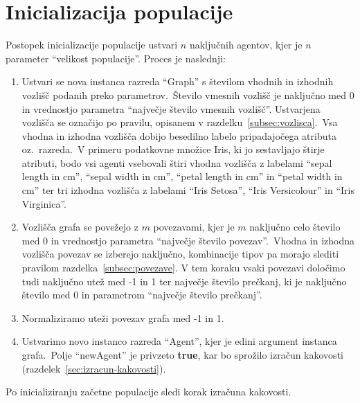 \documentclass[a4paper,12pt,openright]{book}
\begin{document}
    \section{Inicializacija populacije}\label{sec:inicializacija-populacije}
    Postopek inicializacije populacije ustvari $n$ naključnih agentov, kjer je $n$ parameter \enquote{velikost populacije}.
    Proces je naslednji:
    \begin{enumerate}
        \item Ustvari se nova instanca razreda \enquote{Graph} s številom vhodnih in izhodnih vozlišč podanih
        preko parametrov.\ Število vmesnih vozlišč je naključno med 0 in vrednostjo parametra \enquote{največje število vmesnih vozlišč}.
        Ustvarjena vozlišča se označijo po pravilu, opisanem v razdelku~\ref{subsec:vozlisca}.\ Vsa vhodna in izhodna vozlišča
        dobijo besedilno labelo pripadajočega atributa oz.\ razreda.\ V primeru podatkovne množice Iris, ki jo sestavljajo štirje atributi, bodo vsi agenti
        vsebovali štiri vhodna vozlišča z labelami \enquote{sepal length in cm}, \enquote{sepal width in cm}, \enquote{petal length in cm} in
        \enquote{petal width in cm} ter tri izhodna vozlišča z labelami \enquote{Iris Setosa}, \enquote{Iris Versicolour} in
        \enquote{Iris Virginica}.
        \item Vozlišča grafa se povežejo z $m$ povezavami, kjer je $m$ naključno celo število med 0 in vrednostjo
        parametra \enquote{največje število povezav}.\ Vhodna in izhodna vozlišča povezav se izberejo naključno, kombinacije tipov pa
        morajo slediti pravilom razdelka~\ref{subsec:povezave}.
        V tem koraku vsaki povezavi določimo tudi naključno utež med -1 in 1 ter največje število prečkanj, ki je naključno število med 0 in parametrom
        \enquote{največje število prečkanj}.
        \item Normaliziramo uteži povezav grafa med -1 in 1.
        \item Ustvarimo novo instanco razreda \enquote{Agent}, kjer je edini argument instanca grafa.\ Polje \enquote{newAgent}
        je privzeto \textbf{true}, kar bo sprožilo izračun kakovosti (razdelek~\ref{sec:izracun-kakovosti}).
    \end{enumerate}

    Po inicializiranju začetne populacije sledi korak izračuna kakovosti.
\end{document}
